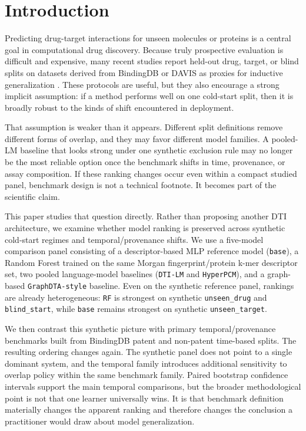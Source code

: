 \section{Introduction}

Predicting drug-target interactions for unseen molecules or proteins is a central goal in computational drug discovery. Because truly prospective evaluation is difficult and expensive, many recent studies report held-out drug, target, or blind splits on datasets derived from BindingDB or DAVIS as proxies for inductive generalization \citep{liu2007bindingdb,davis2011kinase,ahmed2024dtilm,luo2024druglamp,ouyang2024pmmr,liu2025spdti,yu2025gsdti,zhao2025coldstartcpi}. These protocols are useful, but they also encourage a strong implicit assumption: if a method performs well on one cold-start split, then it is broadly robust to the kinds of shift encountered in deployment.

That assumption is weaker than it appears. Different split definitions remove different forms of overlap, and they may favor different model families. A pooled-LM baseline that looks strong under one synthetic exclusion rule may no longer be the most reliable option once the benchmark shifts in time, provenance, or assay composition. If these ranking changes occur even within a compact studied panel, benchmark design is not a technical footnote. It becomes part of the scientific claim.

This paper studies that question directly. Rather than proposing another DTI architecture, we examine whether model ranking is preserved across synthetic cold-start regimes and temporal/provenance shifts. We use a five-model comparison panel consisting of a descriptor-based MLP reference model (\texttt{base}), a Random Forest trained on the same Morgan fingerprint/protein k-mer descriptor set, two pooled language-model baselines (\texttt{DTI-LM} and \texttt{HyperPCM}), and a graph-based \texttt{GraphDTA-style} baseline. Even on the synthetic reference panel, rankings are already heterogeneous: \texttt{RF} is strongest on synthetic \texttt{unseen\_drug} and \texttt{blind\_start}, while \texttt{base} remains strongest on synthetic \texttt{unseen\_target}.

We then contrast this synthetic picture with primary temporal/provenance benchmarks built from BindingDB patent and non-patent time-based splits. The resulting ordering changes again. The synthetic panel does not point to a single dominant system, and the temporal family introduces additional sensitivity to overlap policy within the same benchmark family. Paired bootstrap confidence intervals support the main temporal comparisons, but the broader methodological point is not that one learner universally wins. It is that benchmark definition materially changes the apparent ranking and therefore changes the conclusion a practitioner would draw about model generalization.

